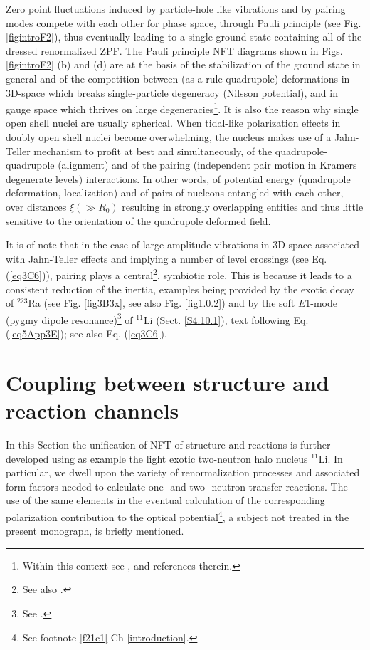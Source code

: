 Zero point fluctuations induced by particle-hole  like vibrations and by pairing modes compete with each other for phase space, through Pauli principle (see Fig. \ref{figintroF2}), thus eventually leading to a single ground state containing all of the dressed renormalized ZPF. The Pauli principle NFT diagrams shown in Figs. \ref{figintroF2} (b) and (d) are at the basis of the stabilization of the ground state in general and of the competition between (as a rule quadrupole) deformations in 3D-space which breaks single-particle degeneracy (Nilsson potential), and in gauge space which thrives on large degeneracies\footnote{Within this context see \cite{Bayman:61,Bes:69,Mottelson:62,Bohr:75}, and references therein.}. It is also the reason why single open shell nuclei are usually spherical. When tidal-like polarization effects in doubly open shell nuclei become overwhelming, the nucleus makes use of a Jahn-Teller mechanism to profit at best and simultaneously, of the quadrupole-quadrupole (alignment) and of the pairing (independent pair motion in Kramers degenerate levels) interactions. In other words, of potential energy (quadrupole deformation, localization) and of pairs of nucleons entangled with  each other, over distances $\xi (\gg R_0)$ resulting in strongly overlapping entities and thus little sensitive to the orientation of the quadrupole deformed field. 

It is of note that in the case of large amplitude vibrations in 3D-space associated with Jahn-Teller effects and implying a number of level crossings (see Eq. (\ref{eq3C6})), pairing plays a central\footnote{See also \cite{Matsuyanagi:13}.}, symbiotic role. This is because it leads to a consistent reduction of the inertia, examples being provided by the exotic decay of $^{223}$Ra (see Fig. \ref{fig3B3x}, see also Fig. \ref{fig1.0.2}) and by the soft $E1$-mode (pygmy dipole resonance)\footnote{See \cite{Broglia:19,Broglia:19c}.} of $^{11}$Li (Sect. \ref{S4.10.1}), text following Eq. (\ref{eq5App3E}); see also Eq. (\ref{eq3C6}).

\section[Coupling between structure and reactions]{Coupling between structure and reaction channels}\label{C1S9}
In this Section the unification of NFT of structure and reactions is further developed using as example the light exotic two-neutron halo nucleus $^{11}$Li. In particular, we dwell upon the variety of renormalization processes and associated form factors needed to calculate one- and two- neutron transfer reactions. The use of the same elements in the eventual calculation of the corresponding polarization contribution to the optical potential\footnote{\label{footnoteOM}See footnote \ref{f21c1} Ch \ref{introduction}.}, a subject not treated in the present monograph, is briefly mentioned.  
